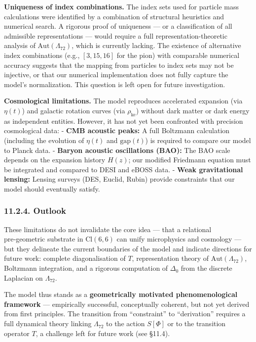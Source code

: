 \documentclass[11pt]{article}
\begin{document}
\textbf{Uniqueness of index combinations.} The index sets used for
particle mass calculations were identified by a combination of
structural heuristics and numerical search. A rigorous proof of
uniqueness --- or a classification of all admissible representations ---
would require a full representation-theoretic analysis of
\(\mathrm{Aut}(\Lambda_{72})\), which is currently lacking. The
existence of alternative index combinations (e.g., \([3,15,16]\) for the
pion) with comparable numerical accuracy suggests that the mapping from
particles to index sets may not be injective, or that our numerical
implementation does not fully capture the model's normalization. This
question is left open for future investigation.

\textbf{Cosmological limitations.} The model reproduces accelerated
expansion (via \(\eta(t)\)) and galactic rotation curves (via
\(\rho_{\text{ke}}\)) without dark matter or dark energy as independent
entities. However, it has not yet been confronted with precision
cosmological data: - \textbf{CMB acoustic peaks:} A full Boltzmann
calculation (including the evolution of \(\eta(t)\) and
\(\text{gap}(t)\)) is required to compare our model to Planck data. -
\textbf{Baryon acoustic oscillations (BAO):} The BAO scale depends on
the expansion history \(H(z)\); our modified Friedmann equation must be
integrated and compared to DESI and eBOSS data. - \textbf{Weak
gravitational lensing:} Lensing surveys (DES, Euclid, Rubin) provide
constraints that our model should eventually satisfy.

\hypertarget{outlook}{%
\subsubsection{11.2.4. Outlook}\label{outlook}}

These limitations do not invalidate the core idea --- that a relational
pre‑geometric substrate in \(\text{Cl}(6,6)\) can unify microphysics and
cosmology --- but they delineate the current boundaries of the model and
indicate directions for future work: complete diagonalisation of \(T\),
representation theory of \(\mathrm{Aut}(\Lambda_{72})\), Boltzmann
integration, and a rigorous computation of \(\Delta_0\) from the
discrete Laplacian on \(\Lambda_{72}\).

The model thus stands as a \textbf{geometrically motivated
phenomenological framework} --- empirically successful, conceptually
coherent, but not yet derived from first principles. The transition from
``constraint'' to ``derivation'' requires a full dynamical theory
linking \(\Lambda_{72}\) to the action \(S[\Phi]\) or to the transition
operator \(T\), a challenge left for future work (see §11.4).
\end{document}
